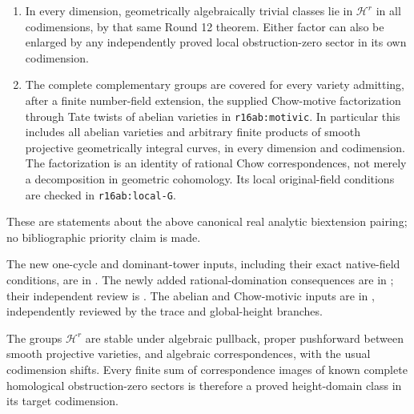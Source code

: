 \begin{corollary}
\begin{enumerate}
      self-pairing
      $\operatorname{CH}^3_{\mathbf Q,\rm hom}\times
       \operatorname{CH}^3_{\mathbf Q,\rm hom}\to\mathbf R$.
      More generally, the same full conclusion holds for targets
      of the rational domination of dimension-at-most-five sources
      satisfying the original-field full-kernel hypothesis of
      \texttt{r16cov:rational-low-dimension}. In higher dimensions,
      one applies \texttt{r16cov:rational-outer} separately to
      both complementary codimensions; a theorem for one factor
      alone does not supply the other factor.
\item In every dimension, geometrically algebraically trivial classes
      lie in $\mathcal H^r$ in all codimensions, by that same Round 12
      theorem. Either factor can also be enlarged by any independently
      proved local obstruction-zero sector in its own codimension.
\item The complete complementary groups are covered for every
      variety admitting, after a finite number-field extension, the
      supplied Chow-motive factorization through Tate twists of
      abelian varieties in \texttt{r16ab:motivic}. In particular this
      includes all abelian varieties and arbitrary finite products
      of smooth projective geometrically integral curves, in every
      dimension and codimension. The factorization is an identity
      of rational Chow correspondences, not merely a decomposition
      in geometric cohomology. Its local original-field conditions
      are checked in \texttt{r16ab:local-G}.
\end{enumerate}
These are statements about the above canonical real analytic
biextension pairing; no bibliographic priority claim is made.
\end{corollary}

The new one-cycle and dominant-tower inputs, including their exact
native-field conditions, are in
.
The newly added rational-domination consequences are in
;
their independent review is
.
The abelian and Chow-motivic inputs are in
,
independently reviewed by the trace and global-height branches.

\begin{corollary}
\label{r16h:domain-functoriality}
The groups $\mathcal H^r$ are stable under algebraic pullback,
proper pushforward between smooth projective varieties, and
algebraic correspondences, with the usual codimension shifts.
Every finite sum of correspondence images of known complete
homological obstruction-zero sectors is therefore a proved
height-domain class in its target codimension.
\end{corollary}

